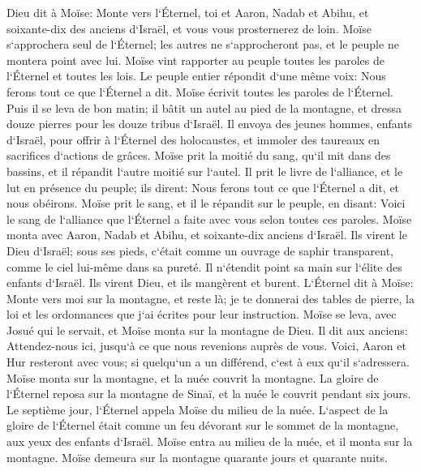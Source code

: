 \verse Dieu dit à Moïse: Monte vers l`Éternel, toi et Aaron, Nadab et Abihu, et soixante-dix des anciens d`Israël, et vous vous prosternerez de loin. 
\verse Moïse s`approchera seul de l`Éternel; les autres ne s`approcheront pas, et le peuple ne montera point avec lui. 
\verse Moïse vint rapporter au peuple toutes les paroles de l`Éternel et toutes les lois. Le peuple entier répondit d`une même voix: Nous ferons tout ce que l`Éternel a dit. 
\verse Moïse écrivit toutes les paroles de l`Éternel. Puis il se leva de bon matin; il bâtit un autel au pied de la montagne, et dressa douze pierres pour les douze tribus d`Israël. 
\verse Il envoya des jeunes hommes, enfants d`Israël, pour offrir à l`Éternel des holocaustes, et immoler des taureaux en sacrifices d`actions de grâces. 
\verse Moïse prit la moitié du sang, qu`il mit dans des bassins, et il répandit l`autre moitié sur l`autel. 
\verse Il prit le livre de l`alliance, et le lut en présence du peuple; ils dirent: Nous ferons tout ce que l`Éternel a dit, et nous obéirons. 
\verse Moïse prit le sang, et il le répandit sur le peuple, en disant: Voici le sang de l`alliance que l`Éternel a faite avec vous selon toutes ces paroles. 
\verse Moïse monta avec Aaron, Nadab et Abihu, et soixante-dix anciens d`Israël. 
\verse Ils virent le Dieu d`Israël; sous ses pieds, c`était comme un ouvrage de saphir transparent, comme le ciel lui-même dans sa pureté. 
\verse Il n`étendit point sa main sur l`élite des enfants d`Israël. Ils virent Dieu, et ils mangèrent et burent. 
\verse L`Éternel dit à Moïse: Monte vers moi sur la montagne, et reste là; je te donnerai des tables de pierre, la loi et les ordonnances que j`ai écrites pour leur instruction. 
\verse Moïse se leva, avec Josué qui le servait, et Moïse monta sur la montagne de Dieu. 
\verse Il dit aux anciens: Attendez-nous ici, jusqu`à ce que nous revenions auprès de vous. Voici, Aaron et Hur resteront avec vous; si quelqu`un a un différend, c`est à eux qu`il s`adressera. 
\verse Moïse monta sur la montagne, et la nuée couvrit la montagne. 
\verse La gloire de l`Éternel reposa sur la montagne de Sinaï, et la nuée le couvrit pendant six jours. Le septième jour, l`Éternel appela Moïse du milieu de la nuée. 
\verse L`aspect de la gloire de l`Éternel était comme un feu dévorant sur le sommet de la montagne, aux yeux des enfants d`Israël. 
\verse Moïse entra au milieu de la nuée, et il monta sur la montagne. Moïse demeura sur la montagne quarante jours et quarante nuits. 

\chapter{}

